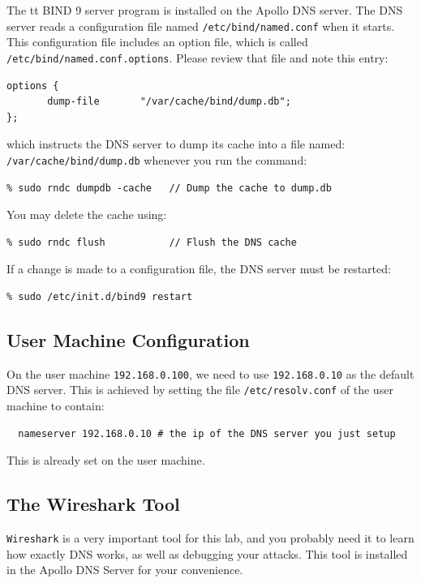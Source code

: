 The {tt BIND 9} server program is installed on the Apollo DNS server.
The DNS server reads a configuration file named
{\tt /etc/bind/named.conf} when it starts. This configuration file includes an option 
file, which is called {\tt /etc/bind/named.conf.options}.  Please 
review that file and note this entry:
\begin{verbatim}
options {
       dump-file       "/var/cache/bind/dump.db";
};
\end{verbatim}

\noindent which instructs the DNS server to dump its cache into
a file named: \texttt{/var/cache/bind/dump.db} 
whenever you run the command:
\begin{verbatim}
% sudo rndc dumpdb -cache 	// Dump the cache to dump.db  
\end{verbatim}
\noindent You may delete the cache using:
\begin{verbatim}
% sudo rndc flush         	// Flush the DNS cache
\end{verbatim}


If a change is made to a configuration file, the DNS server must be
restarted:
\begin{verbatim}
% sudo /etc/init.d/bind9 restart
\end{verbatim}


\subsection{User Machine Configuration} 
\label{subsec:user_machine}

On the user machine {\tt 192.168.0.100}, we need to use 
{\tt 192.168.0.10} as the default DNS server. This is achieved by 
setting the file \texttt{/etc/resolv.conf} of the user machine to contain:

\begin{verbatim}
  nameserver 192.168.0.10 # the ip of the DNS server you just setup
\end{verbatim}

\noindent
This is already set on the user machine.

\subsection{The Wireshark Tool}

{\tt Wireshark} is a very important tool for this lab, and you 
probably need it to learn how exactly DNS works, as well as 
debugging your attacks.  This tool is installed in the Apollo 
DNS Server for your convenience.


